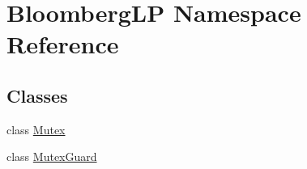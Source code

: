 \hypertarget{namespace_bloomberg_l_p}{}\section{Bloomberg\+LP Namespace Reference}
\label{namespace_bloomberg_l_p}
\subsection*{Classes}
\begin{DoxyCompactItemize}
\item 
class \hyperlink{class_bloomberg_l_p_1_1_mutex}{Mutex}
\item 
class \hyperlink{class_bloomberg_l_p_1_1_mutex_guard}{Mutex\+Guard}
\end{DoxyCompactItemize}
